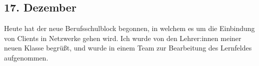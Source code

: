 \subsection{17. Dezember}
Heute hat der neue Berufsschulblock begonnen, in welchem es um die Einbindung von Clients in Netzwerke gehen wird. Ich wurde von den Lehrer:innen meiner neuen Klasse begrüßt, und wurde in einem Team zur Bearbeitung des Lernfeldes aufgenommen.